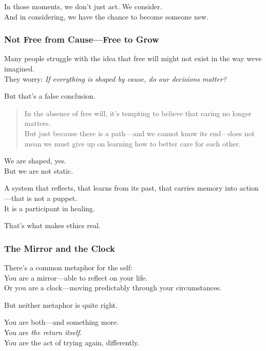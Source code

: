 In those moments, we don't just act. We consider.\\
And in considering, we have the chance to become someone new.

\subsubsection{\texorpdfstring{\textbf{Not Free from Cause---Free to
Grow}}{Not Free from Cause---Free to Grow}}\label{not-free-from-causefree-to-grow}

Many people struggle with the idea that free will might not exist in the
way we\textquotesingle ve imagined.\\
They worry: \emph{If everything is shaped by cause, do our decisions
matter?}

But that's a false conclusion.

\begin{quote}
In the absence of free will, it's tempting to believe that caring no
longer matters.\\
But just because there is a path---and we cannot know its end---does not
mean we must give up on learning how to better care for each other.
\end{quote}

We are shaped, yes.\\
But we are not static.

A system that reflects, that learns from its past, that carries memory
into action---that is not a puppet.\\
It is a participant in healing.

That's what makes ethics real.

\subsubsection{\texorpdfstring{\textbf{The Mirror and the
Clock}}{The Mirror and the Clock}}\label{the-mirror-and-the-clock}

There's a common metaphor for the self:\\
You are a mirror---able to reflect on your life.\\
Or you are a clock---moving predictably through your circumstances.

But neither metaphor is quite right.

You are both---and something more.\\
You are \emph{the return itself}.\\
You are the act of trying again, differently.

